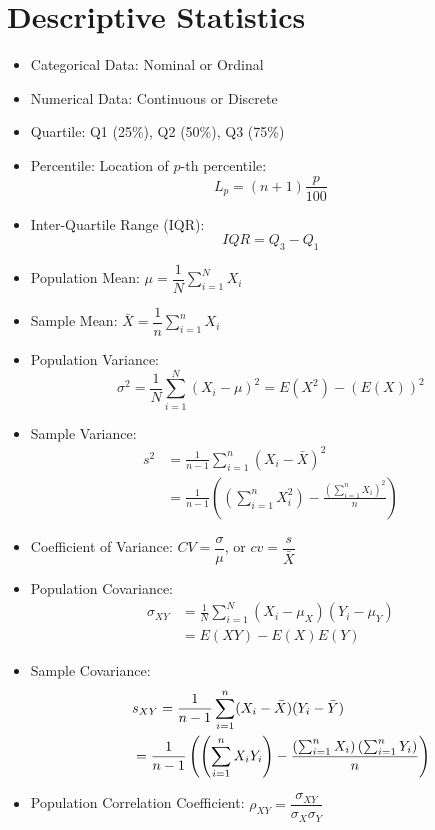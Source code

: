 \documentclass[%
 aip,
 jmp,%
 amsmath,amssymb,
 reprint,%
]{revtex4-1}
\begin{document}
\section{Descriptive Statistics}

\begin{itemize}[label={}]
\item Categorical Data: Nominal or Ordinal 
\item Numerical Data: Continuous or Discrete 
\item Quartile: Q1 (25\%), Q2 (50\%), Q3 (75\%)
\item Percentile: Location of $p$-th percentile: $$L_p = (n+1)\frac{p}{100}$$
\item Inter-Quartile Range (IQR): $$IQR = Q_3 - Q_1$$
\item Population Mean: $\mu = \dfrac{1}{N}\sum_{i=1}^{N}X_i$
\item Sample Mean: $\bar{X} = \dfrac{1}{n}\sum_{i=1}^{n}X_i$
\item Population Variance: $$\sigma^2 = \frac{1}{N}\sum_{i=1}^{N}(X_i-\mu)^2 = E(X^2)-(E(X))^2$$ 
\item Sample Variance: 
    \begin{align*}
        s^2 &= \frac{1}{n-1}\sum_{i=1}^{n}(X_i-\bar{X})^2 \\
            &= \frac{1}{n-1}\left( \left(\sum_{i=1}^{n}X_i^2\right) 
             - \frac{\left(\sum_{i=1}^n X_i\right)^2}{n} \right)        
    \end{align*}
\item Coefficient of Variance: $CV=\dfrac{\sigma}{\mu}$, or $cv=\dfrac{s}{\bar{X}}$
\item Population Covariance: 
    \begin{align*}
        \sigma_{XY} &= \frac{1}{N}\sum_{i=1}^{N}(X_i-\mu_{X})(Y_i-\mu_{Y})\\ &= E(XY) - E(X)E(Y)
    \end{align*}
\item Sample Covariance: 
    \begin{align*}
        \hspace{0.2in}
        & s_{XY} = \frac{1}{n-1}\sum_{i=1}^{n}(X_i-\bar{X})(Y_i-\bar{Y}) \\
        & = \frac{1}{n-1}\left( \left(\sum_{i=1}^{n}X_iY_i\right) 
          - \frac{\left(\sum_{i=1}^n X_i\right)\left(\sum_{i=1}^n Y_i\right)}{n} \right)
    \end{align*}
\item Population Correlation Coefficient: $\rho_{XY} = \dfrac{\sigma_{XY}}{\sigma_{X}\sigma_{Y}}$

\end{itemize}
\end{document}
